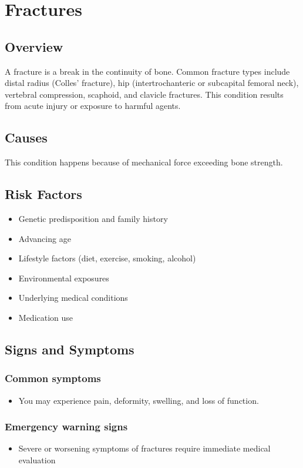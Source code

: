 \chapter{Fractures}
\label{sec:Fractures}

\section{Overview}
A fracture is a break in the continuity of bone. Common fracture types include distal radius (Colles' fracture), hip (intertrochanteric or subcapital femoral neck), vertebral compression, scaphoid, and clavicle fractures. This condition results from acute injury or exposure to harmful agents.
\section{Causes}
This condition happens because of mechanical force exceeding bone strength.     
\section{Risk Factors}

\begin{itemize}[noitemsep]
  \item Genetic predisposition and family history
  \item Advancing age
  \item Lifestyle factors (diet, exercise, smoking, alcohol)
  \item Environmental exposures
  \item Underlying medical conditions
  \item Medication use
\end{itemize}
\section{Signs and Symptoms}

\subsection{Common symptoms}
\begin{itemize}[noitemsep]
  \item You may experience pain, deformity, swelling, and loss of function. 
  \end{itemize}

\subsection{Emergency warning signs}
\begin{itemize}[noitemsep]
  \item Severe or worsening symptoms of fractures require immediate medical evaluation
\end{itemize}
